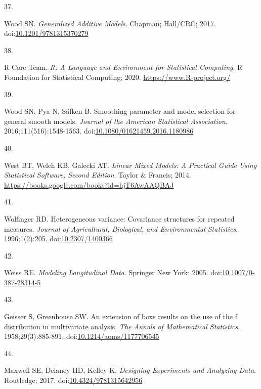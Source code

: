 \documentclass[
]{article}
\newlength{\cslhangindent}
\newlength{\csllabelwidth}
\newlength{\cslentryspacingunit} %
\newenvironment{CSLReferences}[2] %
 {%
  \setlength{\parindent}{0pt}
  \ifodd #1
  \let\oldpar\par
  \def\par{\hangindent=\cslhangindent\oldpar}
  \fi
  \setlength{\parskip}{#2\cslentryspacingunit}
 }%
 {}
\newcommand{\CSLLeftMargin}[1]{\parbox[t]{\csllabelwidth}{#1}}
\newcommand{\CSLRightInline}[1]{\parbox[t]{\linewidth - \csllabelwidth}{#1}\break}
\begin{document}
\begin{CSLReferences}{0}{0}
\leavevmode{}%
\CSLLeftMargin{37. }
\CSLRightInline{Wood SN. \emph{Generalized Additive Models}. Chapman; Hall/{CRC}; 2017. doi:\href{https://doi.org/10.1201/9781315370279}{10.1201/9781315370279}}

\leavevmode{}%
\CSLLeftMargin{38. }
\CSLRightInline{R Core Team. \emph{R: A Language and Environment for Statistical Computing}. R Foundation for Statistical Computing; 2020. \url{https://www.R-project.org/}}

\leavevmode{}%
\CSLLeftMargin{39. }
\CSLRightInline{Wood SN, Pya N, Säfken B. Smoothing parameter and model selection for general smooth models. \emph{Journal of the American Statistical Association}. 2016;111(516):1548-1563. doi:\href{https://doi.org/10.1080/01621459.2016.1180986}{10.1080/01621459.2016.1180986}}

\leavevmode{}%
\CSLLeftMargin{40. }
\CSLRightInline{West BT, Welch KB, Galecki AT. \emph{Linear Mixed Models: A Practical Guide Using Statistical Software, Second Edition}. Taylor \& Francis; 2014. \url{https://books.google.com/books?id=hjT6AwAAQBAJ}}

\leavevmode{}%
\CSLLeftMargin{41. }
\CSLRightInline{Wolfinger RD. Heterogeneous variance: Covariance structures for repeated measures. \emph{Journal of Agricultural, Biological, and Environmental Statistics}. 1996;1(2):205. doi:\href{https://doi.org/10.2307/1400366}{10.2307/1400366}}

\leavevmode{}%
\CSLLeftMargin{42. }
\CSLRightInline{Weiss RE. \emph{Modeling Longitudinal Data}. Springer New York; 2005. doi:\href{https://doi.org/10.1007/0-387-28314-5}{10.1007/0-387-28314-5}}

\leavevmode{}%
\CSLLeftMargin{43. }
\CSLRightInline{Geisser S, Greenhouse SW. An extension of box{\textquotesingle}s results on the use of the {\textdollar}f{\textdollar} distribution in multivariate analysis. \emph{The Annals of Mathematical Statistics}. 1958;29(3):885-891. doi:\href{https://doi.org/10.1214/aoms/1177706545}{10.1214/aoms/1177706545}}

\leavevmode{}%
\CSLLeftMargin{44. }
\CSLRightInline{Maxwell SE, Delaney HD, Kelley K. \emph{Designing Experiments and Analyzing Data}. Routledge; 2017. doi:\href{https://doi.org/10.4324/9781315642956}{10.4324/9781315642956}}


\end{CSLReferences}
\end{document}
